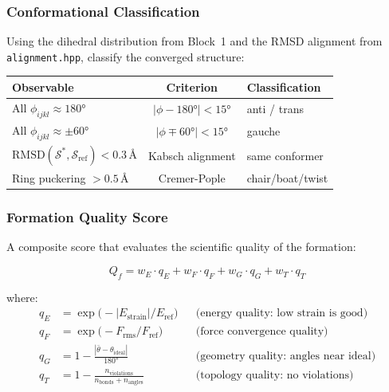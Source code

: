 \documentclass[11pt, a4paper, oneside]{article}
\theoremstyle{definition}
\theoremstyle{remark}
\begin{document}
\subsubsection{Conformational Classification}

Using the dihedral distribution from Block~1 and the RMSD alignment
from \texttt{alignment.hpp}, classify the converged structure:

\begin{center}
\begin{tabular}{lcl}
\toprule
Observable & Criterion & Classification \\
\midrule
All $\phi_{ijkl} \approx 180°$ & $|\phi - 180°| < 15°$ & anti / trans \\
All $\phi_{ijkl} \approx \pm 60°$ & $|\phi \mp 60°| < 15°$ & gauche \\
$\text{RMSD}(\mathcal{S}^*, \mathcal{S}_{\text{ref}}) < 0.3$\,\AA
  & Kabsch alignment & same conformer \\
Ring puckering $> 0.5$\,\AA\ & Cremer-Pople & chair/boat/twist \\
\bottomrule
\end{tabular}
\end{center}

\subsubsection{Formation Quality Score}

A composite score that evaluates the scientific quality of the
formation:

\begin{equation}
\label{eq:formation-quality}
Q_f = w_E \cdot q_E + w_F \cdot q_F + w_G \cdot q_G + w_T \cdot q_T
\end{equation}

where:
\begin{align}
q_E &= \exp\bigl(-|E_{\text{strain}}| / E_{\text{ref}}\bigr)
  && \text{(energy quality: low strain is good)} \\
q_F &= \exp\bigl(-F_{\text{rms}} / F_{\text{ref}}\bigr)
  && \text{(force convergence quality)} \\
q_G &= 1 - \frac{|\bar{\theta} - \theta_{\text{ideal}}|}{180°}
  && \text{(geometry quality: angles near ideal)} \\
q_T &= 1 - \frac{n_{\text{violations}}}{n_{\text{bonds}} + n_{\text{angles}}}
  && \text{(topology quality: no violations)}
\end{align}
\end{document}
